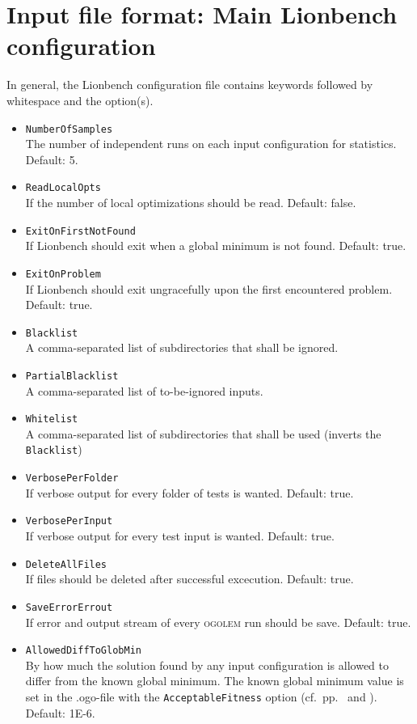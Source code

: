 \documentclass[a4paper,10pt]{scrbook}
\newcommand{\ogo}{\textsc{ogolem}}
\begin{document}
\section{Input file format: Main Lionbench configuration}
In general, the Lionbench configuration file contains keywords followed by 
whitespace and the option(s).
\begin{itemize}
 \item \texttt{NumberOfSamples}\\ The number of independent runs on each input 
configuration for statistics. Default: 5.
 \item \texttt{ReadLocalOpts}\\ If the number of local optimizations should be 
read. Default: false.
 \item \texttt{ExitOnFirstNotFound}\\ If Lionbench should exit when a global 
minimum is not found. Default: true.
 \item \texttt{ExitOnProblem}\\ If Lionbench should exit ungracefully upon the 
first encountered problem. Default: true.
 \item \texttt{Blacklist}\\ A comma-separated list of subdirectories that shall 
be ignored.
 \item \texttt{PartialBlacklist}\\ A comma-separated list of to-be-ignored 
inputs.
 \item \texttt{Whitelist}\\ A comma-separated list of subdirectories that shall 
be used (inverts the \texttt{Blacklist})
 \item \texttt{VerbosePerFolder}\\ If verbose output for every folder of tests 
is wanted. Default: true.
 \item \texttt{VerbosePerInput}\\ If verbose output for every test input is 
wanted. Default: true.
 \item \texttt{DeleteAllFiles}\\ If files should be deleted after successful 
excecution. Default: true.
 \item \texttt{SaveErrorErrout}\\ If error and output stream of every \ogo{} 
run should be save. Default: true.
 \item \texttt{AllowedDiffToGlobMin}\\ By how much the solution found by any 
input configuration is allowed to differ from the known global minimum. The
known global minimum value is set in the .ogo-file with the
\texttt{AcceptableFitness} option (cf.~pp.~\pageref{page1:acceptableFitness}
and \pageref{page2:acceptableFitness}).
Default: 1E-6.
\end{itemize}
\end{document}
